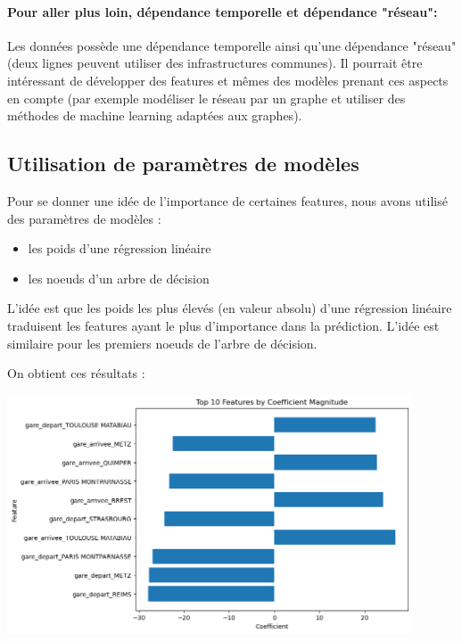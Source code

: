 \documentclass{article}
\begin{document}
\paragraph{Pour aller plus loin, dépendance temporelle et dépendance "réseau":} Les données possède une dépendance temporelle ainsi qu'une dépendance "réseau" (deux lignes peuvent utiliser des infrastructures communes). Il pourrait être intéressant de développer des features et mêmes des modèles prenant ces aspects en compte (par exemple modéliser le réseau par un graphe et utiliser des méthodes de machine learning adaptées aux graphes).

\subsection{Utilisation de paramètres de modèles}

Pour se donner une idée de l'importance de certaines features, nous avons utilisé des paramètres de modèles :
\begin{itemize}[label=\textbullet]
    \item les poids d'une régression linéaire
    \item les noeuds d'un arbre de décision
\end{itemize}

L'idée est que les poids les plus élevés (en valeur absolu) d'une régression linéaire traduisent les features ayant le plus d'importance dans la prédiction. L'idée est similaire pour les premiers noeuds de l'arbre de décision.

On obtient ces résultats :
\begin{center}
\includegraphics[width=12cm]{important_coefs.png}
\end{center}
\end{document}
